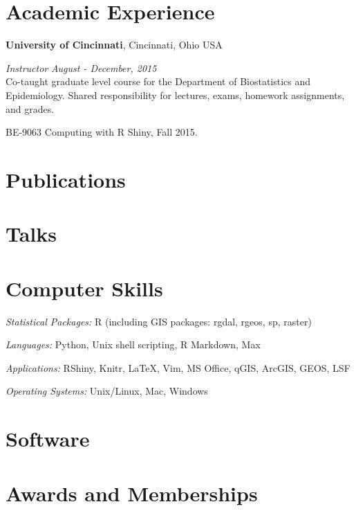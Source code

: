 \documentclass[margin,line]{res}
\newenvironment{list2}{
  \begin{list}{}{%
      \setlength{\itemsep}{0in}
      \setlength{\parsep}{0in} \setlength{\parskip}{0in}
      \setlength{\topsep}{0in} \setlength{\partopsep}{0in} 
      \setlength{\leftmargin}{0.4in}}}{\end{list}}
\newenvironment{list3}{
  \begin{list}{}{%
      \setlength{\itemsep}{0in}
      \setlength{\parsep}{0in} \setlength{\parskip}{0in}
      \setlength{\topsep}{0in} \setlength{\partopsep}{0in} 
      \setlength{\leftmargin}{0in}}}{\end{list}}
\begin{document}
\begin{resume}
\section{\sc Academic Experience}
{\bf University of Cincinnati}, Cincinnati, Ohio USA

{\em Instructor} \hfill \textit{August - December, 2015}\\
Co-taught graduate level course for the Department of Biostatistics and Epidemiology.  Shared responsibility for lectures, exams,
homework assignments, and  grades.
\vspace*{.05in}
\begin{list2}
\item BE-9063 Computing with R Shiny, Fall 2015.
\end{list2}



\section{\sc Publications}


\section{\sc Talks}


\section{\sc Computer Skills}

\begin{list3} \itemsep 4pt
\item[] \textit{Statistical Packages:}  R (including GIS packages: rgdal, rgeos, sp, raster)
\item[] \textit{Languages:} Python, Unix shell scripting, R Markdown, Max
\item[] \textit{Applications:} RShiny, Knitr, \LaTeX, Vim, MS Office, qGIS, ArcGIS, GEOS, LSF
\item[] \textit{Operating Systems:}  Unix/Linux, Mac, Windows\\
\end{list3}

\section{\sc Software}


\section{\sc Awards and Memberships}


\end{resume}
\end{document}
